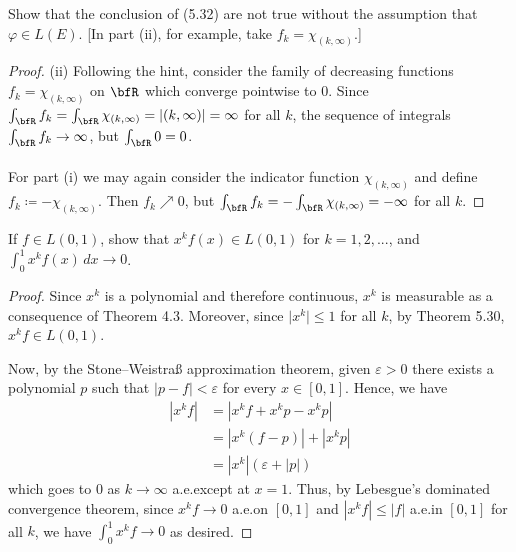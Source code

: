 \begin{problem}
Show that the conclusion of (5.32) are not true without the assumption that
$\varphi\in L(E)$. [In part (ii), for example, take $f_k=\chi_{(k,\infty)}$.]
\end{problem}
\begin{proof}
(ii) Following the hint, consider the family of decreasing functions
$f_k=\chi_{(k,\infty)}$ on $\bfR$ which converge pointwise to $0$. Since
$\int_\bfR f_k=\int_\bfR\chi_{(k,\infty)}=\left|(k,\infty)\right|=\infty$
for all $k$, the sequence of integrals $\int_\bfR f_k\to\infty$, but
$\int_\bfR 0=0$.
\\\\
For part (i) we may again consider the indicator function
$\chi_{(k,\infty)}$ and define $f_k\coloneqq -\chi_{(k,\infty)}$. Then
$f_k\nearrow 0$, but $\int_\bfR f_k=-\int_\bfR\chi_{(k,\infty)}=-\infty$
for all $k$.
\end{proof}
\newpage

\begin{problem}
If $f\in L(0,1)$, show that $x^kf(x)\in L(0,1)$ for $k=1,2,...$, and
$\int_0^1 x^kf(x)\,dx\to 0$.
\end{problem}
\begin{proof}
Since $x^k$ is a polynomial and therefore continuous, $x^k$ is measurable
as a consequence of Theorem 4.3. Moreover, since $\bigl|x^k\bigr|\leq 1$
for all $k$, by Theorem 5.30, $x^kf\in L(0,1)$.

Now, by the Stone--Weistraß approximation theorem, given $\varepsilon>0$
there exists a polynomial $p$ such that
$|p-f|<\varepsilon$ for every $x\in[0,1]$. Hence, we have
\begin{align*}
\left|x^kf\right|&=\left|x^kf+x^kp-x^kp\right|\\
                 &=\left|x^k(f-p)\right|+\left|x^kp\right|\\
                 &=\left|x^k\right|\left(\varepsilon+|p|\right)
\end{align*}
which goes to $0$ as $k\to\infty$ a.e.\@ except at $x=1$. Thus, by
Lebesgue's dominated convergence theorem, since $x^kf\to 0$ a.e.\@ on
$[0,1]$ and $\left|x^kf\right|\leq|f|$ a.e.\@ in $[0,1]$ for all $k$, we
have $\int_0^1 x^kf\to 0$ as desired.
\end{proof}
\newpage

